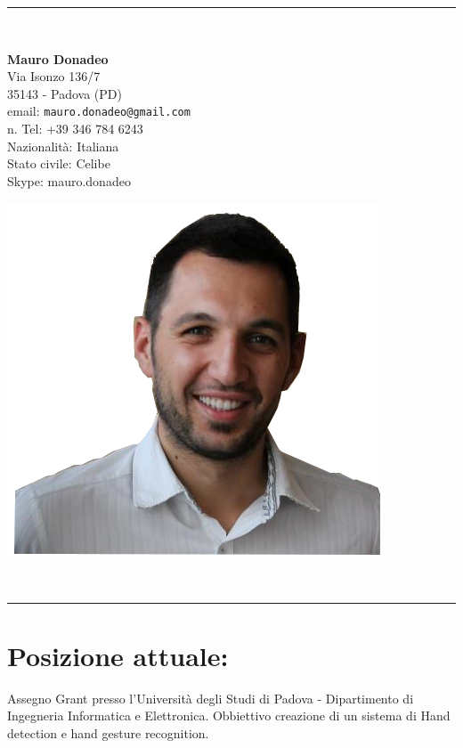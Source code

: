 \documentclass[pdftex,a4paper,10pt,twoside,titlepage,italian,openright]{article}
\begin{document}
\begin{center}
\rule{.8 \textwidth}{1pt}\\[5pt]
\begin{minipage}{.55\textwidth}
	\LARGE\textbf{Mauro Donadeo}\\[20pt]
	\footnotesize Via Isonzo 136/7 \\ 
	35143 - Padova (PD)\\
	email: \texttt{mauro.donadeo@gmail.com}\\
	\footnotesize n. Tel: +39 346 784 6243\\
	\footnotesize Nazionalità: Italiana\\
	\footnotesize Stato civile: Celibe\\
	\footnotesize Skype: mauro.donadeo
\end{minipage}
\begin{minipage}{.25\textwidth}
	\includegraphics[width=\textwidth]{io.jpg}
\end{minipage}\\[5pt]
\rule{.8 \textwidth}{1pt}
\end{center}
\section*{Posizione attuale:}
	Assegno Grant presso l'Università degli Studi di Padova - Dipartimento di Ingegneria Informatica e Elettronica.
	Obbiettivo creazione di un sistema di Hand detection e hand gesture recognition.
\end{document}
